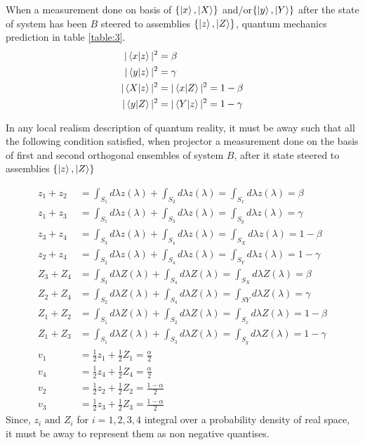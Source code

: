 When a measurement  done on basis of $\{\ket{x},\ket{X}\}$ and/or$\{\ket{y},\ket{Y}\}$  after the state of system has  been $B$ steered to assemblies $\{\ket{z},\ket{Z}\}$, quantum mechanics prediction in table  \ref{table:3}.
\begin{align*}
|\bra{x}\ket{z}|^2&=\beta\\
|\bra{y}\ket{z}|^2&=\gamma\\
|\bra{X}\ket{z}|^2&=|\bra{x}\ket{Z}|^2=1-\beta\\
|\bra{y}\ket{Z}|^2&=|\bra{Y}\ket{z}|^2=1-\gamma
\end{align*}

In any local realism description of quantum reality, it must be away such that all the following condition satisfied, when projector a measurement done on the basis of first and second orthogonal ensembles of system $B$, after it state steered to assemblies $\{\ket{z},\ket{Z}\}$

\begin{align}
z_1+z_2&=\int_{S_1} d\lambda z(\lambda)+\int_{S_2} d\lambda z(\lambda)=\int_{S_x} d\lambda z(\lambda)=\beta\label{Zies1}\\
z_1+z_3&=\int_{S_1} d\lambda z(\lambda)+\int_{S_3} d\lambda z(\lambda)=\int_{S_y} d\lambda z(\lambda)=\gamma\label{Zies2}\\
z_3+z_4&=\int_{S_3} d\lambda z(\lambda)+\int_{S_4} d\lambda z(\lambda)=\int_{S_X} d\lambda z(\lambda)=1-\beta\label{Zies3}\\
z_2+z_4&=\int_{S_2} d\lambda z(\lambda)+\int_{S_4} d\lambda z(\lambda)=\int_{S_Y} d\lambda z(\lambda)=1-\gamma\label{Zies4}\\
Z_3+Z_4&=\int_{S_3} d\lambda Z(\lambda)+\int_{S_4} d\lambda Z(\lambda)=\int_{S_X} d\lambda Z(\lambda)=\beta\label{Zies5}\\
Z_2+Z_4&=\int_{S_2} d\lambda Z(\lambda)+\int_{S_4} d\lambda Z(\lambda)=\int_{SY} d\lambda Z(\lambda)=\gamma\label{Zies6}\\
Z_1+Z_2&=\int_{S_1} d\lambda Z(\lambda)+\int_{S_2} d\lambda Z(\lambda)=\int_{S_x} d\lambda Z(\lambda)=1-\beta\label{Zies7}\\
Z_1+Z_3&=\int_{S_1} d\lambda Z(\lambda)+\int_{S_3} d\lambda Z(\lambda)=\int_{S_y} d\lambda Z(\lambda)=1-\gamma\label{Zies8}\\
v_1&=\frac{1}{2}z_1+\frac{1}{2}Z_1=\frac{\alpha}{2}\label{vies1}\\
v_4&=\frac{1}{2}z_4+\frac{1}{2}Z_4=\frac{\alpha}{2}\label{vies2}\\
v_2&=\frac{1}{2}z_2+\frac{1}{2}Z_2=\frac{1-\alpha}{2}\label{vies3}\\
 v_3&=\frac{1}{2}z_3+\frac{1}{2}Z_3=\frac{1-\alpha}{2}\label{vies4}
\end{align}
Since, $z_i\text{ and } Z_i$ for $i=1,2,3,4$  integral over a probability density of real space, it must be away to represent them as non negative quantises.

